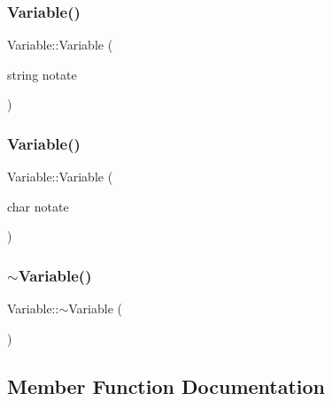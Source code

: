 \subsubsection{\texorpdfstring{Variable()}{Variable()}\hspace{0.1cm}{\footnotesize\ttfamily [1/2]}}
{\footnotesize\ttfamily Variable\+::\+Variable (\begin{DoxyParamCaption}\item[{string}]{notate }\end{DoxyParamCaption})\hspace{0.3cm}{\ttfamily [explicit]}}

\mbox{\label{class_variable_af836f63543807d77dfca8caacd54b1a5}} 
\subsubsection{\texorpdfstring{Variable()}{Variable()}\hspace{0.1cm}{\footnotesize\ttfamily [2/2]}}
{\footnotesize\ttfamily Variable\+::\+Variable (\begin{DoxyParamCaption}\item[{char}]{notate }\end{DoxyParamCaption})\hspace{0.3cm}{\ttfamily [explicit]}}

\mbox{\label{class_variable_a0c619221ab7f65166baf4555c356d83c}} 
\subsubsection{\texorpdfstring{$\sim$\+Variable()}{~Variable()}}
{\footnotesize\ttfamily Variable\+::$\sim$\+Variable (\begin{DoxyParamCaption}{ }\end{DoxyParamCaption})\hspace{0.3cm}{\ttfamily [override]}}



\subsection{Member Function Documentation}
\mbox{\label{class_variable_af8d66ea58702db286b80632de320eafe}} 
